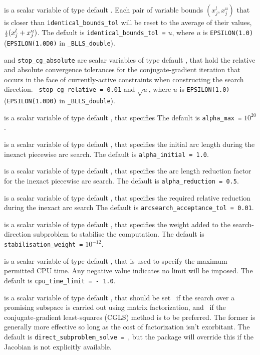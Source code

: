 \documentclass{galahad}
\newcommand{\packagename}{BLLS}
\newcommand{\fullpackagename}{\libraryname\_\packagename}
\begin{document}
\begin{description}
is a scalar variable of type default \realdp.
Each pair of variable bounds $(x_{j}^{l}, x_{j}^{u})$
that is closer than {\tt identical\_bounds\_tol}
will be reset to the average of their values,
${\scriptstyle \frac{1}{2}} (x_{j}^{l} + x_{j}^{u})$.
The default is {\tt identical\_bounds\_tol =} $u$,
where $u$ is {\tt EPSILON(1.0)} ({\tt EPSILON(1.0D0)} in
{\tt \fullpackagename\_double}).

 and {\tt stop\_cg\_absolute}
are scalar variables of type default \realdp,
that hold the relative and absolute convergence tolerances for the
conjugate-gradient iteration that occurs in the face of currently-active
constraints when constructing the search direction.
{\tt \_stop\_cg\_relative = 0.01}
and  $\sqrt{u}$,
where $u$ is {\tt EPSILON(1.0)} ({\tt EPSILON(1.0D0)} in
{\tt \fullpackagename\_double}).

 is a scalar variable of type default \realdp, that specifies
The default is {\tt alpha\_max =} $10^{20}$.

 is a scalar variable of type default \realdp, that
specifies the initial arc length during the inexact piecewise arc search.
The default is {\tt alpha\_initial = 1.0}.

 is a scalar variable of type default \realdp, that
specifies the arc length reduction factor for the inexact piecewise arc search.
The default is {\tt alpha\_reduction = 0.5}.

 is a scalar variable of type default \realdp,
that specifies the required relative reduction during the inexact arc search
The default is {\tt arcsearch\_acceptance\_tol = 0.01}.

 is a scalar variable of type default \realdp,
that specifies the weight added to the search-direction subproblem to 
stabilise the computation.
The default is {\tt stabilisation\_weight =} $10^{-12}$.

 is a scalar variable of type default \realdp,
that is used to specify the maximum permitted CPU time. Any negative
value indicates no limit will be imposed. The default is
{\tt cpu\_time\_limit = - 1.0}.

 is a scalar variable of type default \logical,
that should be set \true\ if the search over a promising subspace is
carried out using matrix factorization, and \false\ if the conjugate-gradient
least-squares (CGLS) method is to be preferred. The former is generally
more effective so long as the cost of factorization isn't exorbitant.
The default is {\tt direct\_subproblem\_solve = \true}, but the
package will override this if the Jacobian is not explicitly available.


\end{description}
\end{document}
